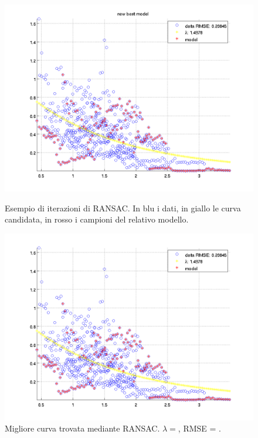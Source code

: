 \documentclass[12pt]{report}
\begin{document}
\begin{figure}[H]
\begin{minipage}[t]{0.5\linewidth}
	\includegraphics[scale=\imFeatRan]{images/ransac12}\\
\end{minipage}
\caption[short]{Esempio di iterazioni di RANSAC. In blu i dati, in giallo le curva candidata, in rosso i campioni del relativo modello.}
\label{fig:ransac2}
\end{figure}

\begin{figure}[H]
	\centering
	\includegraphics[scale=.75]{images/ransacWin}
	\caption{Migliore curva trovata mediante RANSAC. $\lambda = $, RMSE = .}
	\label{fig:ransacWin}
\end{figure}
\end{document}
